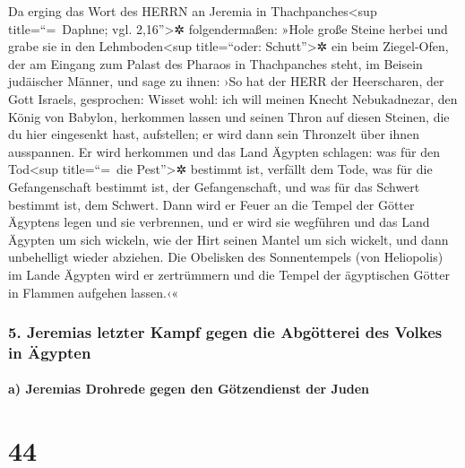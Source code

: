 Da erging das Wort des HERRN an Jeremia in
Thachpanches\textless sup title=``=~Daphne; vgl. 2,16''\textgreater✲
folgendermaßen: »Hole große Steine herbei und grabe sie in
den Lehmboden\textless sup title=``oder: Schutt''\textgreater✲ ein beim
Ziegel-Ofen, der am Eingang zum Palast des Pharaos in Thachpanches
steht, im Beisein judäischer Männer, und sage zu ihnen:
›So hat der HERR der Heerscharen, der Gott Israels, gesprochen: Wisset
wohl: ich will meinen Knecht Nebukadnezar, den König von Babylon,
herkommen lassen und seinen Thron auf diesen Steinen, die du hier
eingesenkt hast, aufstellen; er wird dann sein Thronzelt über ihnen
ausspannen. Er wird herkommen und das Land Ägypten
schlagen: was für den Tod\textless sup title=``=~die Pest''\textgreater✲
bestimmt ist, verfällt dem Tode, was für die Gefangenschaft bestimmt
ist, der Gefangenschaft, und was für das Schwert bestimmt ist, dem
Schwert. Dann wird er Feuer an die Tempel der Götter
Ägyptens legen und sie verbrennen, und er wird sie wegführen und das
Land Ägypten um sich wickeln, wie der Hirt seinen Mantel um sich
wickelt, und dann unbehelligt wieder abziehen. Die
Obelisken des Sonnentempels (von Heliopolis) im Lande Ägypten wird er
zertrümmern und die Tempel der ägyptischen Götter in Flammen aufgehen
lassen.‹«

\hypertarget{jeremias-letzter-kampf-gegen-die-abguxf6tterei-des-volkes-in-uxe4gypten}{%
\subsubsection{5. Jeremias letzter Kampf gegen die Abgötterei des Volkes
in
Ägypten}\label{jeremias-letzter-kampf-gegen-die-abguxf6tterei-des-volkes-in-uxe4gypten}}

\hypertarget{a-jeremias-drohrede-gegen-den-guxf6tzendienst-der-juden}{%
\paragraph{a) Jeremias Drohrede gegen den Götzendienst der
Juden}\label{a-jeremias-drohrede-gegen-den-guxf6tzendienst-der-juden}}

\hypertarget{section-43}{%
\section{44}\label{section-43}}

